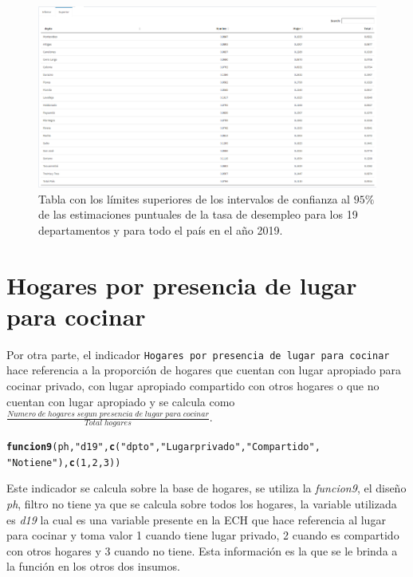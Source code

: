 \documentclass[12pt,twoside,spanish,a4paper]{book}\usepackage[]{graphicx}\usepackage[]{color}
\makeatletter
\newcommand{\hlnum}[1]{\textcolor[rgb]{0.686,0.059,0.569}{#1}}%
\newcommand{\hlstr}[1]{\textcolor[rgb]{0.192,0.494,0.8}{#1}}%
\newcommand{\hlstd}[1]{\textcolor[rgb]{0.345,0.345,0.345}{#1}}%
\newcommand{\hlkwd}[1]{\textcolor[rgb]{0.737,0.353,0.396}{\textbf{#1}}}%
\newenvironment{kframe}{%
 \def\at@end@of@kframe{}%
 \ifinner\ifhmode%
  \def\at@end@of@kframe{\end{minipage}}%
  \begin{minipage}{\columnwidth}%
 \fi\fi%
 \def\FrameCommand##1{\hskip\@totalleftmargin \hskip-\fboxsep
 \colorbox{shadecolor}{##1}\hskip-\fboxsep
     \hskip-\linewidth \hskip-\@totalleftmargin \hskip\columnwidth}%
 \MakeFramed {\advance\hsize-\width
   \@totalleftmargin\z@ \linewidth\hsize
   \@setminipage}}%
 {\par\unskip\endMakeFramed%
 \at@end@of@kframe}
\newenvironment{knitrout}{}{} %
\makeatother
\begin{document}
\begin{figure}[htb]
\includegraphics[width=1.2\textwidth]{img/sup.PNG}
\caption{Tabla con los límites superiores de los intervalos de confianza al $95\%$ de las estimaciones puntuales de la tasa de desempleo para los 19 departamentos y para todo el país en el año 2019. \label{tablsup}}
\end{figure}

\section{Hogares por presencia de lugar para cocinar \label{sec:hog}}

Por otra parte, el indicador \texttt{Hogares por presencia de lugar para cocinar} hace referencia a la proporción de hogares que cuentan con lugar apropiado para cocinar privado, con lugar apropiado compartido con otros hogares o que no cuentan con lugar apropiado y se calcula como $\frac{Numero\; de\; hogares\; segun \;presencia\;de\;lugar\;para\;cocinar}{Total \;hogares}$.

\begin{knitrout}
\color{fgcolor}\begin{kframe}
\begin{alltt}
\hlkwd{funcion9}\hlstd{(ph,} \hlstr{"d19"}\hlstd{,} \hlkwd{c}\hlstd{(}\hlstr{"dpto"}\hlstd{,} \hlstr{"Lugar privado"}\hlstd{,} \hlstr{"Compartido"}\hlstd{,}
         \hlstr{"No tiene"}\hlstd{),} \hlkwd{c}\hlstd{(}\hlnum{1}\hlstd{,}\hlnum{2}\hlstd{,}\hlnum{3}\hlstd{))}
\end{alltt}
\end{kframe}
\end{knitrout}

Este indicador se calcula sobre la base de hogares, se utiliza la \emph{funcion9}, el diseño \emph{ph}, filtro no tiene ya que se calcula sobre todos los hogares, la variable utilizada es \emph{d19} la cual es una variable presente en la ECH que hace referencia al lugar para cocinar y toma valor 1 cuando tiene lugar privado, 2 cuando es compartido con otros hogares y 3 cuando no tiene. Esta información es la que se le brinda a la función en los otros dos insumos.
\end{document}

